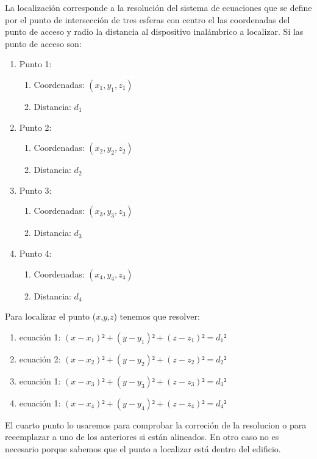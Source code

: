 La localización corresponde a la resolución del sistema de ecuaciones que se define por el punto de intersección de tres esferas con centro el las coordenadas del punto de acceso y radio la distancia al dispositivo inalámbrico a localizar. Si las punto de acceso son:

\begin{enumerate}
\item Punto 1: 
	\begin{enumerate}
	\item Coordenadas: $(x_1,y_1,z_1)$
	\item Distancia: $d_1$
	\end{enumerate}

\item Punto 2: 
	\begin{enumerate}
	\item Coordenadas: $(x_2,y_2,z_2)$
	\item Distancia: $d_2$
	\end{enumerate}

\item Punto 3: 
	\begin{enumerate}
	\item Coordenadas: $(x_3,y_3,z_3)$
	\item Distancia: $d_3$
	\end{enumerate}

\item Punto 4: 
	\begin{enumerate}
	\item Coordenadas: $(x_4,y_4,z_4)$
	\item Distancia: $d_4$
	\end{enumerate}
\end{enumerate}

Para localizar el punto ($x$,$y$,$z$) tenemos que resolver:
\begin{enumerate}
	\item ecuación 1: $(x - x_1)² + (y - y_1)² +(z - z_1)² = d_1² $
	\item ecuación 2: $(x - x_2)² + (y - y_2)² +(z - z_2)² = d_2² $
	\item ecuación 1: $(x - x_3)² + (y - y_3)² +(z - z_3)² = d_3² $
	\item ecuación 1: $(x - x_4)² + (y - y_4)² +(z - z_4)² = d_4² $
\end{enumerate}

El cuarto punto lo usaremos para comprobar la correción de la resolucion o para reeemplazar a uno de los anteriores si están alineados. En otro caso no es necesario porque sabemos que el punto a localizar está dentro del edificio.\newline

